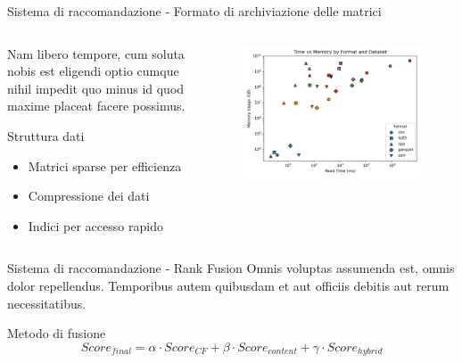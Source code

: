 \documentclass{beamer}
\begin{document}
	\begin{frame}{Sistema di raccomandazione - Formato di archiviazione delle matrici}
			\begin{columns}
				\begin{column}{0.6\textwidth}
					Nam libero tempore, cum soluta nobis est eligendi optio cumque nihil impedit quo minus id quod maxime placeat facere possimus.

					\begin{block}{Struttura dati}
						\begin{itemize}
							\item Matrici sparse per efficienza
							\item Compressione dei dati
							\item Indici per accesso rapido
						\end{itemize}
					\end{block}
				\end{column}
				\begin{column}{0.4\textwidth}
					\begin{figure}
						\centering
						\includegraphics[width=\textwidth]{time_vs_memory.png}
					\end{figure}
				\end{column}
			\end{columns}
	\end{frame}

	\begin{frame}{Sistema di raccomandazione - Rank Fusion}
		Omnis voluptas assumenda est, omnis dolor repellendus. Temporibus autem quibusdam et aut officiis debitis aut rerum necessitatibus.

		\begin{alertblock}{Metodo di fusione}
			$$ Score_{final} = \alpha \cdot Score_{CF} + \beta \cdot Score_{content} + \gamma \cdot Score_{hybrid} $$
		\end{alertblock}
	\end{frame}
\end{document}
